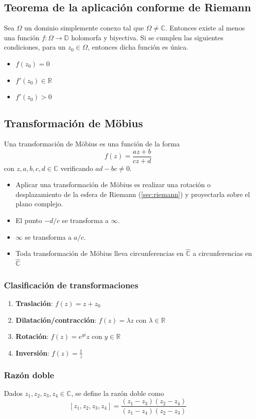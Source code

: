 \documentclass[paper=a4, fontsize=11pt]{scrartcl}
\numberwithin{equation}{section}
\numberwithin{figure}{section}
\numberwithin{table}{section}
\begin{document}
\subsection{Teorema de la aplicación conforme de Riemann}
Sea $\Omega$ un dominio simplemente conexo tal que $\Omega\neq\mathbb{C}$. Entonces existe al menos una función $f:\Omega\to\mathbb{D}$ holomorfa y biyectiva.
Si se cumplen las siguientes condiciones, para un $z_0\in\Omega$, entonces dicha función es única.
\begin{itemize}
\item $f(z_0)=0$
\item $f'(z_0)\in\mathbb{R}$
\item $f'(z_0)>0$
\end{itemize}

\subsection{Transformación de Möbius}
Una transformación de Möbius es una función de la forma
$$f(z) = \frac{az+b}{cz+d}$$
con $z,a,b,c,d\in\mathbb{C}$ verificando $ad-bc\neq 0$.
\begin{itemize}
\item Aplicar una transformación de Möbius es realizar una rotación o desplazamiento de la esfera de Riemann (\ref{sec:riemann}) y proyectarla sobre el plano complejo.
\item El punto $-d/c$ se transforma a $\infty$.
\item $\infty$ se transforma a $a/c$.
\item Toda transformación de Möbius lleva circunferencias en $\hat{\mathbb{C}}$ a circunferencias en $\hat{\mathbb{C}}$
\end{itemize}

\subsubsection{Clasificación de transformaciones}
\begin{enumerate}
\item \textbf{Traslación}: $f(z) = z+z_0$
\item \textbf{Dilatación/contracción}: $f(z) = \lambda z$ con $\lambda\in \mathbb{R}$
\item \textbf{Rotación}: $f(z) = e^{yi}z$ con $y\in\mathbb{R}$
\item \textbf{Inversión}: $f(z) = \frac{1}{z}$
\end{enumerate}

\subsubsection{Razón doble}
Dados $z_1,z_2,z_3,z_4\in\mathbb{C}$, se define la razón doble como
$$[z_1,z_2,z_3,z_4] = \frac{(z_1-z_3)(z_2-z_4)}{(z_1-z_4)(z_2-z_3)}$$
\end{document}
